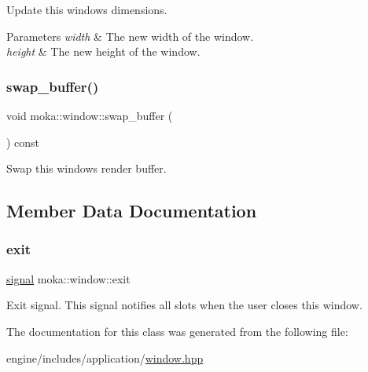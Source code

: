 Update this window\textquotesingle{}s dimensions. 


\begin{DoxyParams}{Parameters}
{\em width} & The new width of the window. \\
\hline
{\em height} & The new height of the window. \\
\hline
\end{DoxyParams}
\mbox{\label{classmoka_1_1window_a7d1752b776c77ac0885d44fdba2fa0d7}} 
\subsubsection{\texorpdfstring{swap\_buffer()}{swap\_buffer()}}
{\footnotesize\ttfamily void moka\+::window\+::swap\+\_\+buffer (\begin{DoxyParamCaption}{ }\end{DoxyParamCaption}) const}



Swap this window\textquotesingle{}s render buffer. 



\subsection{Member Data Documentation}
\mbox{\label{classmoka_1_1window_aafcb86998fd7046a82e9abfcb0b2b21c}} 
\subsubsection{\texorpdfstring{exit}{exit}}
{\footnotesize\ttfamily \mbox{\hyperlink{classmoka_1_1signal}{signal}} moka\+::window\+::exit}



Exit signal. This signal notifies all slots when the user closes this window. 



The documentation for this class was generated from the following file\+:\begin{DoxyCompactItemize}
\item 
engine/includes/application/\mbox{\hyperlink{window_8hpp}{window.\+hpp}}\end{DoxyCompactItemize}
